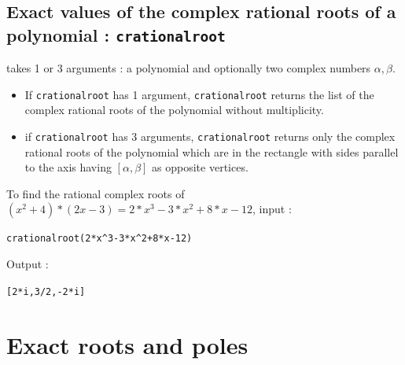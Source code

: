 \documentclass[a4paper,11pt]{book}
\begin{document}
\subsection{Exact values of the complex rational roots of a polynomial : {\tt crationalroot}}
 takes 1 or 3 arguments : a polynomial and  
optionally two complex numbers $\alpha,\beta$.
\begin{itemize}
\item If {\tt crationalroot} has 1 argument, {\tt crationalroot} returns the 
list of the complex rational roots of the 
polynomial without multiplicity.
\item if {\tt crationalroot} has 3 arguments, {\tt crationalroot} returns only
the complex rational roots of the 
polynomial which are in the rectangle with sides parallel to the 
axis having $[\alpha,\beta]$ as opposite vertices.
\end{itemize}
To find the rational complex roots of 
$(x^2+4)*(2x-3)=2*x^3-3*x^2+8*x-12$, input :
\begin{center}{\tt crationalroot(2*x\verb|^|3-3*x\verb|^|2+8*x-12)}\end{center}
Output :
\begin{center}{\tt [2*i,3/2,-2*i]}\end{center} 

\section{Exact roots and poles}
\end{document}

